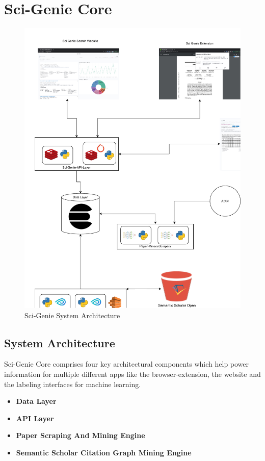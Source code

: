 \chapter{Sci-Genie Core}
\label{sci-genie-core}
\begin{figure}[p]
    \centering
    \includegraphics[width=\maxwidth{\textwidth}]{src/images/Sci-Genie-Arch.pdf}
    \caption{Sci-Genie System Architecture}
    \label{figure\arabic{figurecounter}}
\end{figure}

\section{System Architecture}

Sci-Genie Core comprises four key architectural components which help power information for multiple different apps like the browser-extension, the website and the labeling interfaces for machine learning. 
\begin{itemize}
    \item \textbf{Data Layer}
    \item \textbf{API Layer}
    \item \textbf{Paper Scraping And Mining Engine}
    \item \textbf{Semantic Scholar Citation Graph Mining Engine}
\end{itemize}

